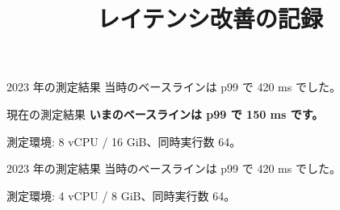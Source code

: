 

\title{レイテンシ改善の記録}
\maketitle



\begin{frame}{2023 年の測定結果}
{%
\color{blue}
当時のベースラインは p99 で 420 ms でした。
}

\end{frame}



\begin{frame}{現在の測定結果}
{%
\color{orange!80!black}\bfseries
いまのベースラインは p99 で 150 ms です。
}

測定環境: 8 vCPU / 16 GiB、同時実行数 64。
\end{frame}



\begin{frame}{2023 年の測定結果}
{%
\color{blue}
当時のベースラインは p99 で 420 ms でした。
}

測定環境: 4 vCPU / 8 GiB、同時実行数 64。
\end{frame}


